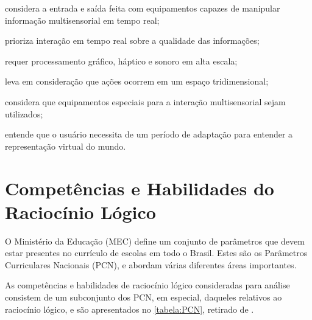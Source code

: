 \begin{alineas}
	\item considera a entrada e saída feita com equipamentos capazes de manipular 
	informação multisensorial em tempo real;
	\item prioriza interação em tempo real sobre a qualidade das informações;
	\item requer processamento gráfico, háptico e sonoro em alta escala;
	\item leva em consideração que ações ocorrem em um espaço tridimensional;
	\item considera que equipamentos especiais para a interação multisensorial sejam
	utilizados;
	\item entende que o usuário necessita de um período de adaptação para entender a
	representação virtual do mundo.
\end{alineas}

\section{Competências e Habilidades do Raciocínio Lógico}\label{sec-competenciashabilidades}

O Ministério da Educação (MEC) define um conjunto de parâmetros que devem estar
presentes no currículo de escolas em todo o Brasil. Estes são os Parâmetros
Curriculares Nacionais (PCN), e abordam várias diferentes áreas importantes. 

As competências e habilidades de raciocínio lógico consideradas para análise
consistem de um subconjunto dos PCN, em especial, daqueles relativos ao 
raciocínio lógico, e são apresentados no \autoref{tabela:PCN}, retirado de
\cite{Tabuti:2015:tabela_habilidades}.

